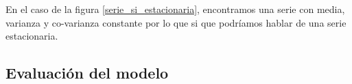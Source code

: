 En el caso de la figura \ref{serie_si_estacionaria}, encontramos una serie con media, varianza y co-varianza constante por lo que si que podríamos hablar de una serie estacionaria. 

\subsection{Evaluación del modelo}



%
%
%
%
%
%
%
%
%
%
%
%
%
%
%
%
%
%
%
%
%
